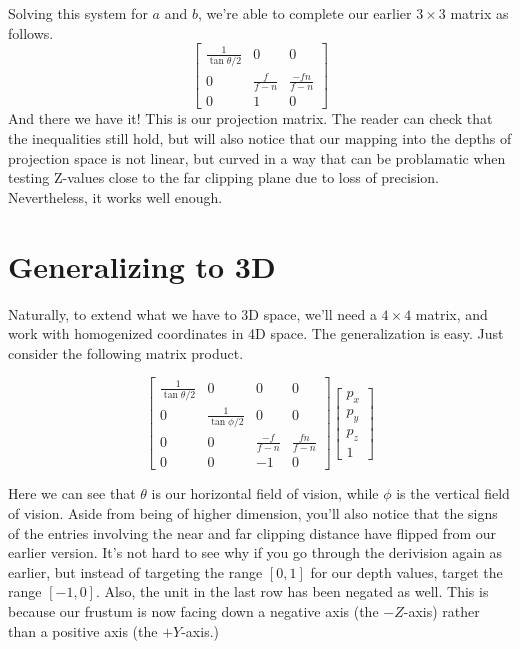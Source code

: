 \documentclass[12pt]{article}
\begin{document}
Solving this system for $a$ and $b$, we're able to complete our earlier $3\times 3$ matrix as follows.
\begin{equation*}
\left[
\begin{array}{ccc}
\frac{1}{\tan\theta/2} & 0 & 0 \\
0 & \frac{f}{f-n} & \frac{-fn}{f-n} \\
0 & 1 & 0
\end{array}
\right]
\end{equation*}
And there we have it!  This is our projection matrix.  The reader can check that the inequalities still hold, but will also notice that our mapping into the depths of projection space is not linear, but curved in a way that can be problamatic when testing Z-values close to the far clipping plane due to loss of precision.  Nevertheless, it works well enough.

\section*{Generalizing to 3D}

Naturally, to extend what we have to 3D space, we'll need a $4\times 4$ matrix, and work with homogenized coordinates in 4D space.  The generalization is easy.  Just consider the following matrix product.

\begin{equation*}
\left[
\begin{array}{cccc}
\frac{1}{\tan\theta/2} & 0 & 0 & 0 \\
0 & \frac{1}{\tan\phi/2} & 0 & 0 \\
0 & 0 & \frac{-f}{f-n} & \frac{fn}{f-n} \\
0 & 0 & -1 & 0
\end{array}
\right]\left[
\begin{array}{c}
p_x \\
p_y \\
p_z \\
1
\end{array}
\right]
\end{equation*}

Here we can see that $\theta$ is our horizontal field of vision, while $\phi$ is the vertical field of vision.  Aside from being of higher dimension, you'll also notice that the signs of the entries involving the near and far clipping distance have flipped from our earlier version.  It's not hard to see why if you go through the derivision again as earlier, but instead of targeting the range $[0,1]$ for our depth values, target the range $[-1,0]$.  Also, the unit in the last row has been negated as well.  This is because our frustum is now facing down a negative axis (the $-Z$-axis) rather than a positive axis (the $+Y$-axis.)
\end{document}
